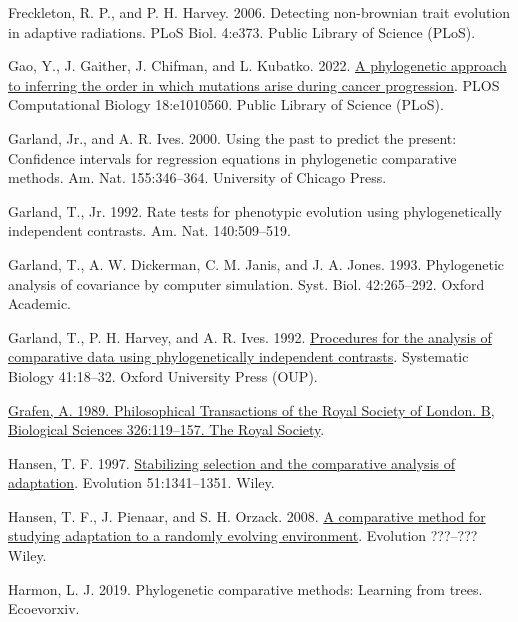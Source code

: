 \documentclass[fleqn,10pt,lineno]{wlpeerj} %
\newlength{\cslhangindent}
\newenvironment{CSLReferences}[2] %
 {\begin{list}{}{%
  \setlength{\itemindent}{0pt}
  \setlength{\leftmargin}{0pt}
  \setlength{\parsep}{0pt}
  \ifodd #1
   \setlength{\leftmargin}{\cslhangindent}
   \setlength{\itemindent}{-1\cslhangindent}
  \fi
  \setlength{\itemsep}{#2\baselineskip}}}
 {\end{list}}
\begin{document}
\begin{CSLReferences}{1}{0}
Freckleton, R. P., and P. H. Harvey. 2006. Detecting non-brownian trait evolution in adaptive radiations. PLoS Biol. 4:e373. Public Library of Science (PLoS).

Gao, Y., J. Gaither, J. Chifman, and L. Kubatko. 2022. \href{https://doi.org/10.1371/journal.pcbi.1010560}{A phylogenetic approach to inferring the order in which mutations arise during cancer progression}. PLOS Computational Biology 18:e1010560. Public Library of Science (PLoS).

Garland, Jr., and A. R. Ives. 2000. Using the past to predict the present: Confidence intervals for regression equations in phylogenetic comparative methods. Am. Nat. 155:346--364. University of Chicago Press.

Garland, T., Jr. 1992. Rate tests for phenotypic evolution using phylogenetically independent contrasts. Am. Nat. 140:509--519.

Garland, T., A. W. Dickerman, C. M. Janis, and J. A. Jones. 1993. Phylogenetic analysis of covariance by computer simulation. Syst. Biol. 42:265--292. Oxford Academic.

Garland, T., P. H. Harvey, and A. R. Ives. 1992. \href{https://doi.org/10.1093/sysbio/41.1.18}{Procedures for the analysis of comparative data using phylogenetically independent contrasts}. Systematic Biology 41:18--32. Oxford University Press (OUP).

\href{https://doi.org/10.1098/rstb.1989.0106}{Grafen, A. 1989. Philosophical Transactions of the Royal Society of London. B, Biological Sciences 326:119--157. The Royal Society}.

Hansen, T. F. 1997. \href{https://doi.org/10.1111/j.1558-5646.1997.tb01457.x}{Stabilizing selection and the comparative analysis of adaptation}. Evolution 51:1341--1351. Wiley.

Hansen, T. F., J. Pienaar, and S. H. Orzack. 2008. \href{https://doi.org/10.1111/j.1558-5646.2008.00412.x}{A comparative method for studying adaptation to a randomly evolving environment}. Evolution ???--??? Wiley.

Harmon, L. J. 2019. Phylogenetic comparative methods: Learning from trees. Ecoevorxiv.


\end{CSLReferences}
\end{document}

